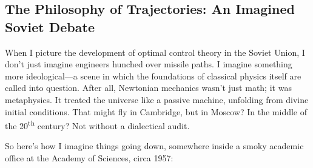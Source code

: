 \subsection{The Philosophy of Trajectories: An Imagined Soviet Debate}

When I picture the development of optimal control theory in the Soviet Union, I don’t just imagine engineers hunched over missile paths. I imagine something more ideological—a scene in which the foundations of classical physics itself are called into question. After all, Newtonian mechanics wasn’t just math; it was metaphysics. It treated the universe like a passive machine, unfolding from divine initial conditions. That might fly in Cambridge, but in Moscow? In the middle of the 20\textsuperscript{th} century? Not without a dialectical audit.

So here’s how I imagine things going down, somewhere inside a smoky academic office at the Academy of Sciences, circa 1957:

